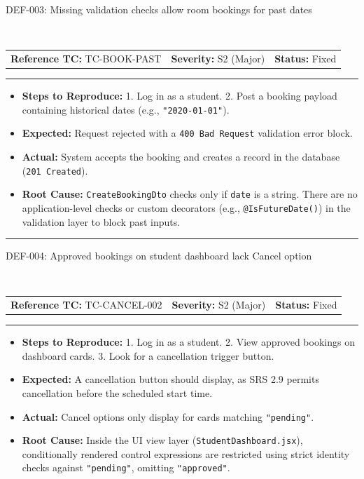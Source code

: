 \documentclass[11pt,a4paper]{article}
\makeatletter
\newcommand{\defectheader}[5]{%
    \needspace{6\baselineskip}
    \noindent\colorbox{primaryblue}{\parbox{\dimexpr\textwidth-2\fboxsep\relax}{
        \color{white}\bfseries\large\strut #1: #2
    }}
    \nopagebreak\\
    \noindent\begin{tabularx}{\textwidth}{@{}X X X@{}}
        \textbf{Reference TC:} #3 & \textbf{Severity:} #4 & \textbf{Status:} #5 \\
    \end{tabularx}
    \nopagebreak\vspace{0.1cm}
    \nopagebreak\hrule\vspace{0.2cm}
}
\makeatother
\begin{document}
\newpage

\defectheader{DEF-003}{Missing validation checks allow room bookings for past dates}{TC-BOOK-PAST}{S2 (Major)}{Fixed}
\begin{itemize}[noitemsep,topsep=1pt,leftmargin=0.5cm]
    \item \textbf{Steps to Reproduce:} 
    1. Log in as a student. 2. Post a booking payload containing historical dates (e.g., \texttt{"2020-01-01"}).
    \item \textbf{Expected:} Request rejected with a \texttt{400 Bad Request} validation error block.
    \item \textbf{Actual:} System accepts the booking and creates a record in the database (\texttt{201 Created}).
    \item \textbf{Root Cause:} \texttt{CreateBookingDto} checks only if \texttt{date} is a string. There are no application-level checks or custom decorators (e.g., \texttt{@IsFutureDate()}) in the validation layer to block past inputs.
\end{itemize}

\vspace{0.4cm}\hrule\vspace{0.4cm}

\defectheader{DEF-004}{Approved bookings on student dashboard lack Cancel option}{TC-CANCEL-002}{S2 (Major)}{Fixed}
\begin{itemize}[noitemsep,topsep=1pt,leftmargin=0.5cm]
    \item \textbf{Steps to Reproduce:} 
    1. Log in as a student. 2. View approved bookings on dashboard cards. 3. Look for a cancellation trigger button.
    \item \textbf{Expected:} A cancellation button should display, as SRS 2.9 permits cancellation before the scheduled start time.
    \item \textbf{Actual:} Cancel options only display for cards matching \texttt{"pending"}.
    \item \textbf{Root Cause:} Inside the UI view layer (\texttt{StudentDashboard.jsx}), conditionally rendered control expressions are restricted using strict identity checks against \texttt{"pending"}, omitting \texttt{"approved"}.
\end{itemize}

\newpage
\end{document}

